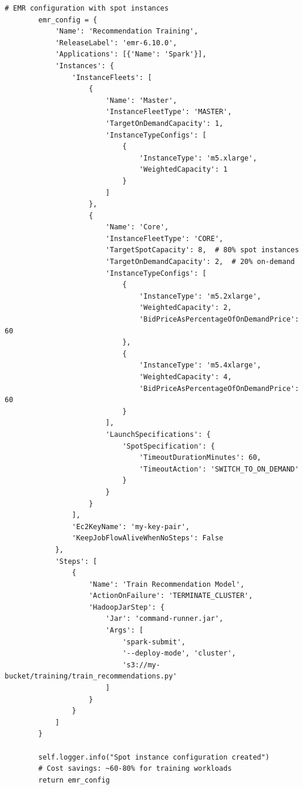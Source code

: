 \begin{lstlisting}[style=python, caption=Cost Optimization Implementation]
        # EMR configuration with spot instances
        emr_config = {
            'Name': 'Recommendation Training',
            'ReleaseLabel': 'emr-6.10.0',
            'Applications': [{'Name': 'Spark'}],
            'Instances': {
                'InstanceFleets': [
                    {
                        'Name': 'Master',
                        'InstanceFleetType': 'MASTER',
                        'TargetOnDemandCapacity': 1,
                        'InstanceTypeConfigs': [
                            {
                                'InstanceType': 'm5.xlarge',
                                'WeightedCapacity': 1
                            }
                        ]
                    },
                    {
                        'Name': 'Core',
                        'InstanceFleetType': 'CORE',
                        'TargetSpotCapacity': 8,  # 80% spot instances
                        'TargetOnDemandCapacity': 2,  # 20% on-demand
                        'InstanceTypeConfigs': [
                            {
                                'InstanceType': 'm5.2xlarge',
                                'WeightedCapacity': 2,
                                'BidPriceAsPercentageOfOnDemandPrice': 60
                            },
                            {
                                'InstanceType': 'm5.4xlarge',
                                'WeightedCapacity': 4,
                                'BidPriceAsPercentageOfOnDemandPrice': 60
                            }
                        ],
                        'LaunchSpecifications': {
                            'SpotSpecification': {
                                'TimeoutDurationMinutes': 60,
                                'TimeoutAction': 'SWITCH_TO_ON_DEMAND'
                            }
                        }
                    }
                ],
                'Ec2KeyName': 'my-key-pair',
                'KeepJobFlowAliveWhenNoSteps': False
            },
            'Steps': [
                {
                    'Name': 'Train Recommendation Model',
                    'ActionOnFailure': 'TERMINATE_CLUSTER',
                    'HadoopJarStep': {
                        'Jar': 'command-runner.jar',
                        'Args': [
                            'spark-submit',
                            '--deploy-mode', 'cluster',
                            's3://my-bucket/training/train_recommendations.py'
                        ]
                    }
                }
            ]
        }

        self.logger.info("Spot instance configuration created")
        # Cost savings: ~60-80% for training workloads
        return emr_config


\end{lstlisting}
